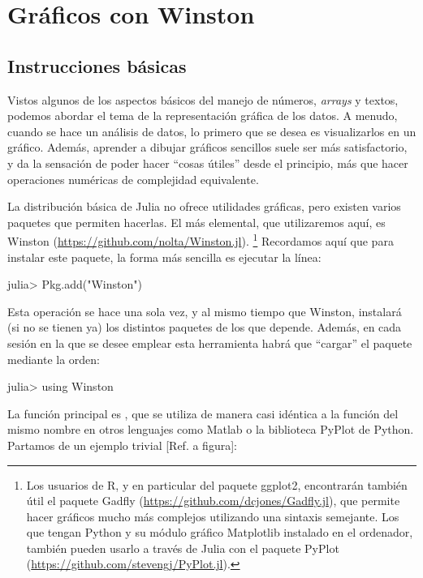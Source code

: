 \chapter{Gráficos con Winston}

\section{Instrucciones básicas}

Vistos algunos de los aspectos básicos del manejo de números, \emph{arrays} y textos, podemos abordar el tema de la representación gráfica de los datos. A menudo, cuando se hace un análisis de datos, lo primero que se desea es visualizarlos en un gráfico. Además, aprender a dibujar gráficos sencillos suele ser más satisfactorio, y da la sensación de poder hacer ``cosas útiles'' desde el principio, más que hacer operaciones numéricas de complejidad equivalente.

La distribución básica de Julia no ofrece utilidades gráficas, pero existen varios paquetes que permiten hacerlas. El más elemental, que utilizaremos aquí, es Winston (\url{https://github.com/nolta/Winston.jl}).%
\footnote{%
Los usuarios de R, y en particular del paquete ggplot2, encontrarán también útil el paquete Gadfly (\url{https://github.com/dcjones/Gadfly.jl}), que permite hacer gráficos mucho más complejos utilizando una sintaxis semejante. Los que tengan Python y su módulo gráfico Matplotlib instalado en el ordenador, también pueden usarlo a través de Julia con el paquete PyPlot (\url{https://github.com/stevengj/PyPlot.jl}).%
}
Recordamos aquí que para instalar este paquete, la forma más sencilla es ejecutar la línea:

\begin{jlconcode}
julia> Pkg.add("Winston")
\end{jlconcode}

Esta operación se hace una sola vez, y al mismo tiempo que Winston, instalará (si no se tienen ya) los distintos paquetes de los que depende. Además, en cada sesión en la que se desee emplear esta herramienta habrá que ``cargar'' el paquete mediante la orden:

\begin{jlconcode}
julia> using Winston
\end{jlconcode}

La función principal es , que se utiliza de manera casi idéntica a la función del mismo nombre en otros lenguajes como Matlab o la biblioteca PyPlot de Python. Partamos de un ejemplo trivial [Ref. a figura]:

